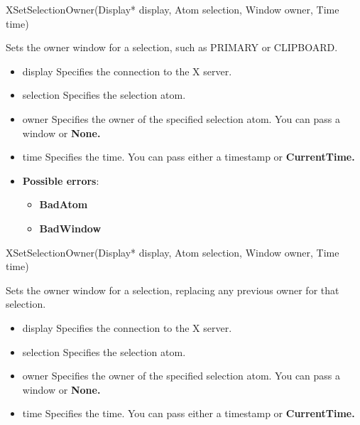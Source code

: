 \documentclass{report}
\begin{document}
\begin{itemize}
            \begin{cppcode}
            XSetSelectionOwner(Display* display, Atom selection, Window owner, Time time)
            \end{cppcode}
            \bigbreak \noindent
            Sets the owner window for a selection, such as PRIMARY or CLIPBOARD.

            \begin{itemize}
                \item display Specifies the connection to the X server.
                \item selection Specifies the selection atom.
                \item owner Specifies the owner of the specified selection atom. You can pass a window or \textbf{None.}
                \item time Specifies the time. You can pass either a timestamp or \textbf{CurrentTime.}
            \end{itemize}

            \begin{itemize}
                \item \textbf{Possible errors}:
                    \begin{itemize}
                        \item \textbf{BadAtom}
                        \item \textbf{BadWindow}
                    \end{itemize}
            \end{itemize}

            \begin{cppcode}
            XSetSelectionOwner(Display* display, Atom selection, Window owner, Time time)
            \end{cppcode}
            \bigbreak \noindent
            Sets the owner window for a selection, replacing any previous owner for that selection.

            \begin{itemize}
                \item display Specifies the connection to the X server.
                \item selection Specifies the selection atom.
                \item owner Specifies the owner of the specified selection atom. You can pass a window or \textbf{None.}
                \item time Specifies the time. You can pass either a timestamp or \textbf{CurrentTime.}
            \end{itemize}


\end{itemize}
\end{document}

